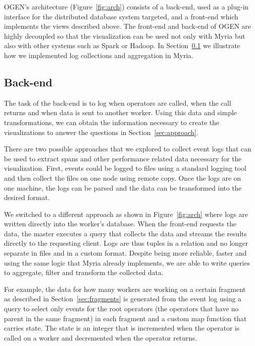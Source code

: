 \documentclass{chi2009}
\newcommand*{\system}{OGEN\xspace}
\begin{document}

\system's architecture (Figure~\ref{fig:arch}) consists of a back-end,
used as a plug-in interface for the distributed database system targeted, and a
front-end which implements the views described above. The front-end and
back-end of \system are highly decoupled so that the visualization can be used not only with
Myria but also with other systems such as Spark or Hadoop. In
Section~\ref{sec:back} we illustrate how we implemented log collections and
aggregation in Myria.

\subsection{Back-end}
\label{sec:back}

The task of the back-end is to log when operators are called, when the call returns and when data is sent to another worker. Using this data and simple transformations, we can obtain the information necessary to create the visualizations to answer the questions in Section~\ref{sec:approach}.

There are two possible approaches that we explored to collect event logs that can be used to extract spans and other performance related data necessary for the visualization. First, events could be logged to files using a standard logging tool and then collect the files on one node using remote copy. Once the logs are on one machine, the logs can be parsed and the data can be transformed into the desired format.

We switched to a different approach as shown in Figure~\ref{fig:arch} where logs are written directly into the worker's database. When the front-end requests the data, the master executes a query that collects the data and streams the results directly to the requesting client. Logs are thus tuples in a relation and no longer separate in files and in a custom format. Despite being more reliable, faster and using the same logic that Myria already implements, we are able to write queries to aggregate, filter and transform the collected data.

For example, the data for how many workers are working on a certain fragment as described in Section~\ref{sec:fragments} is generated from the event log using a query to select only events for the root operators (the operators that have no parent in the same fragment) in each fragment and a custom map function that carries state. The state is an integer that is incremented when the operator is called on a worker and decremented when the operator returns.
\end{document}
